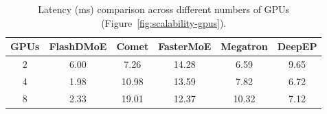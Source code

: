 \begin{table}[!ht]
    \centering
    \caption{Latency (ms) comparison across different numbers of GPUs (Figure~\ref{fig:scalability-gpus}).}
    \label{tab:latency-gpus}
    \setlength{\tabcolsep}{5pt}
    \renewcommand{\arraystretch}{0.9}
    \begin{tabular}{cccccc}
        \toprule
        \textbf{GPUs} & \textbf{FlashDMoE} & \textbf{Comet} & \textbf{FasterMoE} & \textbf{Megatron} & \textbf{DeepEP} \\
        \midrule
        2 & 6.00 & 7.26 & 14.28 & 6.59 & 9.65 \\
        4 & 1.98 & 10.98 & 13.59 & 7.82 & 6.72 \\
        8 & 2.33 & 19.01 & 12.37 & 10.32 & 7.12 \\
        \bottomrule
    \end{tabular}
    \vspace{-0.4cm}
\end{table}